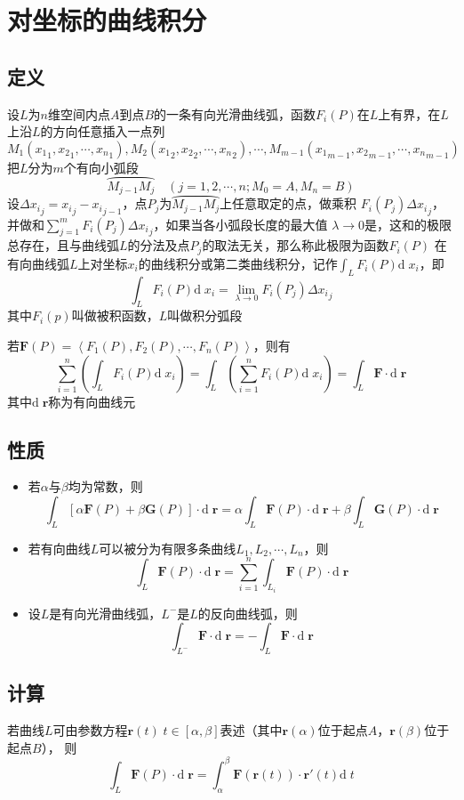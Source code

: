 \documentclass[UTF8]{ctexart}
\newcommand{\dif}[1]{{\mathrm{d}\;\!#1}}
\newcommand{\ve}[1]{{\bm{#1}}}
\newcommand{\emplin}{\vspace{1em}}
\begin{document}
\section*{对坐标的曲线积分}
\subsection*{定义}
设$L$为$n$维空间内点$A$到点$B$的一条有向光滑曲线弧，函数$F_i(P)$在$L$上有界，在$L$上沿$L$的方向任意插入一点列
$M_1({x_1}_1,{x_2}_1,\cdots,{x_n}_1),M_2({x_1}_2,{x_2}_2,\cdots,{x_n}_2),\cdots,M_{m-1}({x_1}_{m-1},{x_2}_{m-1},\cdots,{x_n}_{m-1})$
把$L$分为$m$个有向小弧段
\[ \wideparen{M_{j-1}M_j}\quad(j=1,2,\cdots,n;M_0=A,M_n=B)\]
设$\Delta {x_i}_j={x_i}_j-{x_i}_{j-1}$，点$P_j$为$\wideparen{M_{j-1}M_j}$上任意取定的点，做乘积
$F_i(P_j)\Delta {x_i}_j$，并做和$\sum_{j=1}^mF_i(P_j)\Delta {x_i}_j$，如果当各小弧段长度的最大值
$\lambda\to0$是，这和的极限总存在，且与曲线弧$L$的分法及点$P_j$的取法无关，那么称此极限为函数$F_i(P)$
在有向曲线弧$L$上对坐标$x_i$的曲线积分或第二类曲线积分，记作$\int_LF_i(P)\dif{x_i}$，即
\[\int_LF_i(P)\dif{x_i}=\lim_{\lambda\to0}F_i(P_j)\Delta {x_i}_j\]
其中$F_i(p)$叫做被积函数，$L$叫做积分弧段

\emplin

若$\ve{F}(P)=\left\langle F_1(P),F_2(P),\cdots,F_n(P) \right\rangle$，则有
\[\sum^n_{i=1}\left(\int_LF_i(P)\dif{x_i}\right)=\int_L\left(\sum^n_{i=1}F_i(P)\dif{x_i}\right)=\int_L\ve{F}\cdot\dif{\ve{r}}\]
其中$\dif{\ve{r}}$称为有向曲线元

\emplin

\subsection*{性质}
\begin{itemize}
  \item 若$\alpha$与$\beta$均为常数，则
  \[\int_L[\alpha\ve{F}(P)+\beta\ve{G}(P)]\cdot\dif{\ve{r}}=\alpha\int_L\ve{F}(P)\cdot\dif{\ve{r}}+\beta\int_L\ve{G}(P)\cdot\dif{\ve{r}}\]
  \item 若有向曲线$L$可以被分为有限多条曲线$L_1,L_2,\cdots,L_n$，则
  \[ \int_L\ve{F}(P)\cdot\dif{\ve{r}}=\sum^n_{i=1}\int_{L_i}\ve{F}(P)\cdot\dif{\ve{r}} \]
  \item 设$L$是有向光滑曲线弧，$L^-$是$L$的反向曲线弧，则
  \[\int_{L^-}\ve{F}\cdot\dif{\ve{r}}=-\int_L\ve{F}\cdot\dif{\ve{r}}\]
\end{itemize}

\emplin

\subsection*{计算}
若曲线$L$可由参数方程$\ve{r}(t)\;t\in[\alpha,\beta]$表述（其中$\ve{r}(\alpha)$位于起点$A$，$\ve{r}(\beta)$位于起点$B$），
则
\[\int_L\ve{F}(P)\cdot\dif{\ve{r}}=\int_\alpha^\beta \ve{F}(\ve{r}(t))\cdot\ve{r}'(t)\dif{t}\]
\end{document}

